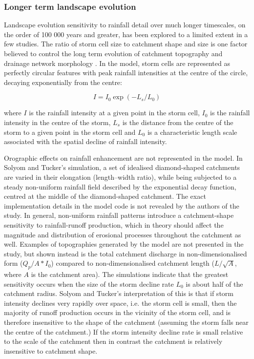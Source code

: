 \subsubsection{Longer term landscape evolution}

Landscape evolution sensitivity to rainfall detail over much longer timescales, on the order of 100 000 years and greater, has been explored to a limited extent in a few studies. The ratio of storm cell size to catchment shape and size is one factor believed to control the long term evolution of catchment topography and drainage network morphology \citep{solyom2007importance}. In the \citet{solyom2007importance} model, storm cells are represented as perfectly circular features with peak rainfall intensities at the centre of the circle, decaying exponentially from the centre:

\begin{equation}
I = I_0 \exp(-L_s/L_0)
\end{equation}

\noindent
where \(I\) is the rainfall intensity at a given point in the storm cell, \(I_0\) is the rainfall intensity in the centre of the storm, \(L_s\) is the distance from the centre of the storm to a given point in the storm cell and \(L_0\) is a characteristic length scale associated with the spatial decline of rainfall intensity.

Orographic effects on rainfall enhancement are not represented in the model. In Solyom and Tucker's simulation, a set of idealised diamond-shaped catchments are varied in their elongation (length--width ratio), while being subjected to a steady non-uniform rainfall field described by the exponential decay function, centred at the middle of the diamond-shaped catchment. The exact implementation details in the model code is not revealed by the authors of the study. In general, non-uniform rainfall patterns introduce a catchment-shape sensitivity to rainfall-runoff production, which in theory should affect the magnitude and distribution of erosional processes throughout the catchment as well. Examples of topographies generated by the model are not presented in the study, but shown instead is the total catchment discharge in non-dimensionalised form (\(Q_p/A*I_0\)) compared to non-dimensionalised catchment length (\(L/\sqrt{A}\), where \(A\) is the catchment area). The simulations indicate that the greatest sensitivity occurs when the size of the storm decline rate \(L_0\) is about half of the catchment radius. Solyom and Tucker's interpretation of this is that if storm intensity declines very rapidly over space, i.e. the storm cell is small, then the majority of runoff production occurs in the vicinity of the storm cell, and is therefore insensitive to the shape of the catchment (assuming the storm falls near the centre of the catchment.) If the storm intensity decline rate is small relative to the scale of the catchment then in contrast the catchment is relatively insensitive to catchment shape.


